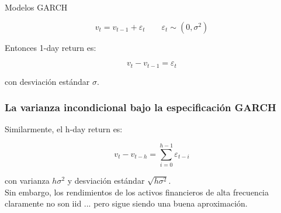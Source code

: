 \documentclass[xcolor=(list of options)]{beamer}
\begin{document}
\begin{section}{Modelos GARCH}
\begin{frame}
\begin{center}
\begin{equation}
v_{t}=v_{t-1}+\varepsilon_{t}\qquad\varepsilon_{t}\sim(0,\sigma^{2})
\end{equation}
$ $
\par\end{center}

Entonces 1-day return es: 

\begin{center}
\[
v_{t}-v_{t-1}=\varepsilon_{t}
\]

\par\end{center}

con desviaci\'on est\'andar $\sigma$. 
\end{frame}

\begin{frame}
\frametitle{La varianza incondicional bajo la especificación GARCH}

Similarmente, el h-day return es: 

\begin{center}
\begin{equation}
v_{t}-v_{t-h}=\sum_{i=0}^{h-1}\varepsilon_{t-i}
\end{equation}

\par\end{center}

con varianza $h\sigma^{2}$ y desviaci\'on est\'andar $\sqrt{h\sigma^{2}}$.
\\
Sin embargo, los rendimientos de los activos financieros de alta frecuencia claramente no son iid ... pero sigue siendo una buena aproximaci\'on.

\end{frame}
\end{section}

\end{document}
